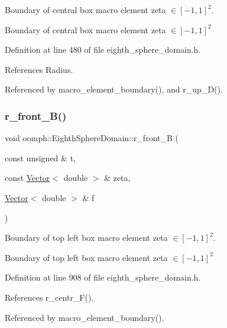 Boundary of central box macro element zeta $ \in [-1,1]^2 $. 

Boundary of central box macro element zeta $ \in [-1,1]^2 $ 

Definition at line 480 of file eighth\+\_\+sphere\+\_\+domain.\+h.



References Radius.



Referenced by macro\+\_\+element\+\_\+boundary(), and r\+\_\+up\+\_\+\+D().

\mbox{\label{classoomph_1_1EighthSphereDomain_aa62bb16a2963530246c8cc9ef905c944}} 
\subsubsection{\texorpdfstring{r\+\_\+front\+\_\+\+B()}{r\_front\_B()}}
{\footnotesize\ttfamily void oomph\+::\+Eighth\+Sphere\+Domain\+::r\+\_\+front\+\_\+B (\begin{DoxyParamCaption}\item[{const unsigned \&}]{t,  }\item[{const \hyperlink{classoomph_1_1Vector}{Vector}$<$ double $>$ \&}]{zeta,  }\item[{\hyperlink{classoomph_1_1Vector}{Vector}$<$ double $>$ \&}]{f }\end{DoxyParamCaption})\hspace{0.3cm}{\ttfamily [private]}}



Boundary of top left box macro element zeta $ \in [-1,1]^2 $. 

Boundary of top left box macro element zeta $ \in [-1,1]^2 $ 

Definition at line 908 of file eighth\+\_\+sphere\+\_\+domain.\+h.



References r\+\_\+centr\+\_\+\+F().



Referenced by macro\+\_\+element\+\_\+boundary().

\mbox{\label{classoomph_1_1EighthSphereDomain_a46ccabe44dd16cae048c302d5cfe26ee}} 
